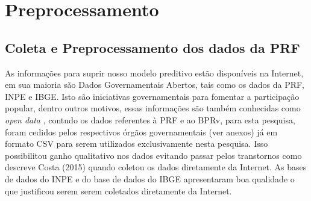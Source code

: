 \chapter{Preprocessamento}\label{pre}

\section{Coleta e Preprocessamento dos dados da PRF}\label{intro:metodologia}


As informações para suprir nosso modelo preditivo estão disponíveis na Internet, em sua maioria são Dados Governamentais Abertos, tais como os dados
da PRF, INPE e IBGE. Isto são iniciativas governamentais para fomentar a participação popular, dentro outros motivos, essas informações são também 
conhecidas como \textit{open data} \cite{DadosGoverno}, contudo os dados referentes à PRF e ao BPRv, para esta pesquisa, foram cedidos pelos respectivos 
órgãos governamentais (ver anexos) já em formato CSV para serem utilizados exclusivamente nesta pesquisa. Isso possibilitou ganho qualitativo nos dados evitando 
passar pelos transtornos como descreve Costa (2015) quando coletou os dados diretamente da Internet.\cite{Costa2015} 
As bases de dados do INPE e do base de dados do IBGE apresentaram boa qualidade o que justificou serem serem coletados diretamente da Internet.


